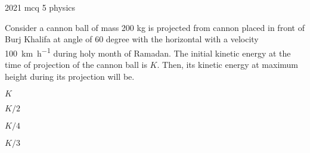 \ylDisplay
{}%
{2021}%
{mcq}%
{5}%
{physics}%
{}%
{
\ifStatement
Consider a cannon ball of mass 200 kg is projected from cannon placed in front of Burj Khalifa at angle of 60 degree with the horizontal with a velocity \SI{100}{\km\per\hour} during holy month of Ramadan. The initial kinetic energy at the time of projection of the cannon ball is $K$. Then, its kinetic energy at maximum height during its projection will be.
\fi


$K$
\fi


$K/2 $
\fi


$K/4$
\fi


$K/3$
\fi


\ifHint

\fi


\ifSolution

\fi


\ifEstStatement

\fi



\fi



\fi



\fi



\fi


\ifEstHint

\fi


\ifEstSolution

\fi
}
